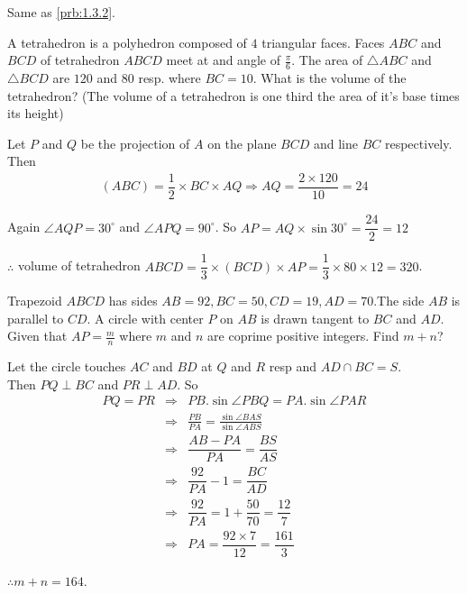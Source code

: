 \documentclass{subfile}
\begin{document}
		\begin{solution}
			Same as \eqref{prb:1.3.2}.
		\end{solution}

		\begin{problem}
			A tetrahedron is a polyhedron composed of $4$ triangular faces. Faces $ABC$ and $BCD$ of tetrahedron $ABCD$ meet at and angle of $\frac{\pi}{6}$. The area of $\triangle ABC$ and $\triangle BCD$ are $120$ and $80$ resp. where $BC=10$. What is the volume of the tetrahedron? (The volume of a tetrahedron is one third the area of it's base times its height)
		\end{problem}
		\begin{solution} Let $P$ and $Q$ be the projection of $A$ on the plane $BCD$ and line $BC$ respectively. Then
				\begin{align*}
					(ABC)=\dfrac{1}{2}\times BC\times AQ \Longrightarrow AQ=\dfrac{2\times 120}{10}=24
				\end{align*}

			Again $\angle AQP=30^{\circ}$ and $\angle APQ=90^{\circ}$. So $AP=AQ\times \sin 30^{\circ}=\dfrac{24}{2}=12$

			$\therefore$ volume of tetrahedron $ABCD=\dfrac{1}{3}\times (BCD)\times AP=\dfrac{1}{3}\times 80 \times 12=320$.

		\end{solution}

		\begin{problem}
			Trapezoid $ABCD$ has sides $AB=92,BC=50,CD=19,AD=70$.The side $AB$ is parallel to $CD$. A circle with center $P$ on $AB$ is drawn tangent to $BC$ and $AD$. Given that $AP=\frac{m}{n}$ where $m$ and $n$ are coprime positive integers. Find $m+n$?
		\end{problem}

		\begin{solution} Let the circle touches $AC$ and $BD$ at $Q$ and $R$ resp and $AD\cap BC=S$.\\
			Then $PQ\perp BC$ and $PR\perp AD$.
			So
		\begin{eqnarray*}
			PQ=PR
			& \Longrightarrow & PB.\sin \angle PBQ=PA.\sin \angle PAR\\
			& \Longrightarrow & \frac{PB}{PA}=\frac{\sin \angle BAS}{\sin \angle ABS}\\
			& \Longrightarrow & \dfrac{AB-PA}{PA}=\dfrac{BS}{AS}\\
			& \Longrightarrow & \dfrac{92}{PA}-1=\dfrac{BC}{AD}\\
			& \Longrightarrow & \dfrac{92}{PA}=1+\dfrac{50}{70}=\dfrac{12}{7}\\
			& \Longrightarrow & PA=\dfrac{92\times 7}{12}=\dfrac{161}{3}
		\end{eqnarray*}

			$\therefore m+n=164$.

		\end{solution}
\end{document}

